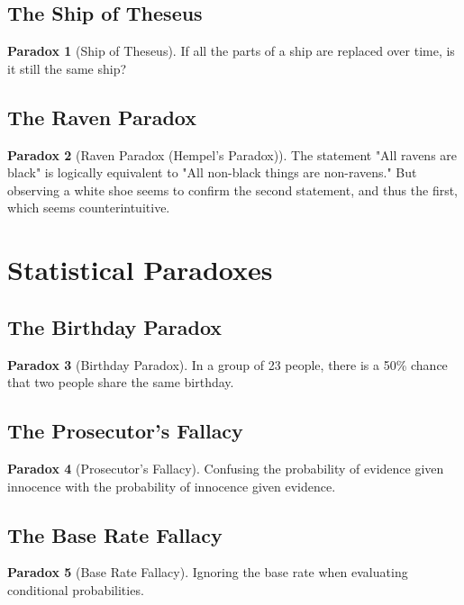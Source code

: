 \documentclass[11pt]{article}
\theoremstyle{definition}
\newtheorem{paradox}{Paradox}[section]
\begin{document}
\subsection{The Ship of Theseus}
\begin{paradox}[Ship of Theseus]
If all the parts of a ship are replaced over time, is it still the same ship?
\end{paradox}

\subsection{The Raven Paradox}
\begin{paradox}[Raven Paradox (Hempel's Paradox)]
The statement "All ravens are black" is logically equivalent to "All non-black things are non-ravens." But observing a white shoe seems to confirm the second statement, and thus the first, which seems counterintuitive.
\end{paradox}

\section{Statistical Paradoxes}

\subsection{The Birthday Paradox}
\begin{paradox}[Birthday Paradox]
In a group of 23 people, there is a 50\% chance that two people share the same birthday.
\end{paradox}

\subsection{The Prosecutor's Fallacy}
\begin{paradox}[Prosecutor's Fallacy]
Confusing the probability of evidence given innocence with the probability of innocence given evidence.
\end{paradox}

\subsection{The Base Rate Fallacy}
\begin{paradox}[Base Rate Fallacy]
Ignoring the base rate when evaluating conditional probabilities.
\end{paradox}
\end{document}
